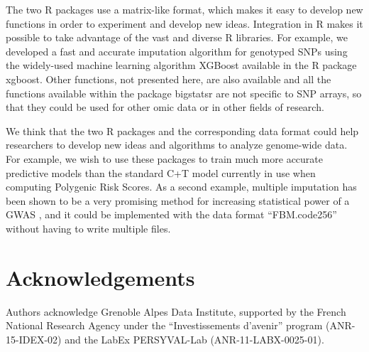 \documentclass{bioinfo}
\begin{document}
The two R packages use a matrix-like format, which makes it easy to develop new functions in order to experiment and develop new ideas. Integration in R makes it possible to take advantage of the vast and diverse R libraries. For example, we developed a fast and accurate imputation algorithm for genotyped SNPs using the widely-used machine learning algorithm XGBoost available in the R package xgboost. Other functions, not presented here, are also available and all the functions available within the package bigstatsr are not specific to SNP arrays, so that they could be used for other omic data or in other fields of research.

We think that the two R packages and the corresponding data format could help researchers to develop new ideas and algorithms to analyze genome-wide data. For example, we wish to use these packages to train much more accurate predictive models than the standard C+T model currently in use when computing Polygenic Risk Scores. As a second example, multiple imputation has been shown to be a very promising method for increasing statistical power of a GWAS \cite[]{Palmer2016}, and it could be implemented with the data format ``FBM.code256'' without having to write multiple files.


\section*{Acknowledgements}

Authors acknowledge Grenoble Alpes Data Institute, supported by the French National Research Agency under the ``Investissements d'avenir'' program (ANR-15-IDEX-02) and the LabEx PERSYVAL-Lab (ANR-11-LABX-0025-01).

\vspace*{-12pt}



\end{document}
